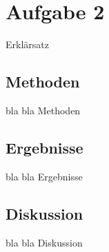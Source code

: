 \section{Aufgabe 2}
Erklärsatz

\subsection{Methoden}
bla bla Methoden

\subsection{Ergebnisse}
bla bla Ergebnisse

\subsection{Diskussion}
bla bla Diskussion


